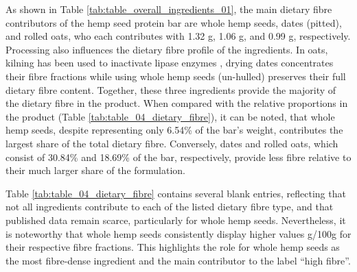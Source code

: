 \vspace{1em}
As shown in Table \ref*{tab:table_overall_ingredients_01}, the main dietary fibre contributors of the hemp seed protein bar are whole hemp seeds, dates (pitted), and rolled oats, who each contributes with 1.32 g, 1.06 g, and 0.99 g, respectively. Processing also influences the dietary fibre profile of the ingredients. In oats, kilning has been used to inactivate lipase enzymes \cite*{art_24_oat_kilning}, drying dates concentrates their fibre fractions while using whole hemp seeds (un-hulled) preserves their full dietary fibre content. Together, these three ingredients provide the majority of the dietary fibre in the product. When compared with the relative proportions in the product (Table \ref*{tab:table_04_dietary_fibre}), it can be noted, that whole hemp seeds, despite representing only 6.54\% of the bar’s weight, contributes the largest share of the total dietary fibre. Conversely, dates and rolled oats, which consist of 30.84\% and 18.69\% of the bar, respectively, provide less fibre relative to their much larger share of the formulation.

\vspace{1em}
Table \ref*{tab:table_04_dietary_fibre} contains several blank entries, reflecting that not all ingredients contribute to each of the listed dietary fibre type, and that published data remain scarce, particularly for whole hemp seeds. Nevertheless, it is noteworthy that whole hemp seeds consistently display higher values g/100g for their respective fibre fractions. This highlights the role for whole hemp seeds as the most fibre-dense ingredient and the main contributor to the label “high fibre”.


